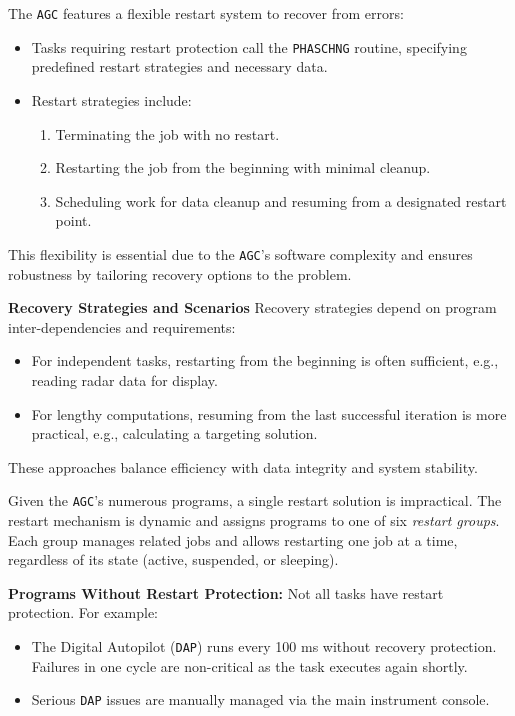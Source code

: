 \documentclass[refcap, oxford]{ahsan}
\begin{document}
The \texttt{AGC} features a flexible restart system to recover from errors:
\begin{itemize}
    \item Tasks requiring restart protection call the \texttt{PHASCHNG} routine,
        specifying predefined restart strategies and necessary data.
    \item Restart strategies include:
    \begin{enumerate}
        \item Terminating the job with no restart.
        \item Restarting the job from the beginning with minimal cleanup.
        \item Scheduling work for data cleanup and resuming from a designated restart
            point.
    \end{enumerate}
\end{itemize}
This flexibility is essential due to the \texttt{AGC}'s software complexity and ensures
robustness by tailoring recovery options to the problem.

\textbf{Recovery Strategies and Scenarios} Recovery strategies depend on program
inter-dependencies and requirements:
\begin{itemize}
    \item For independent tasks, restarting from the beginning is often sufficient,
        e.g., reading radar data for display.
    \item For lengthy computations, resuming from the last successful iteration is more
        practical, e.g., calculating a targeting solution.
\end{itemize}
These approaches balance efficiency with data integrity and system stability.

Given the \texttt{AGC}'s numerous programs, a single restart solution is impractical.
The restart mechanism is dynamic and assigns programs to one of six \textit{restart
groups}. Each group manages related jobs and allows restarting one job at a time,
regardless of its state (active, suspended, or sleeping).

\textbf{Programs Without Restart Protection:} Not all tasks have restart protection.
For example:
\begin{itemize}
    \item The Digital Autopilot (\texttt{DAP}) runs every 100 ms without recovery
        protection. Failures in one cycle are non-critical as the task executes again
        shortly.
    \item Serious \texttt{DAP} issues are manually managed via the main instrument
        console.
\end{itemize}
\end{document}
